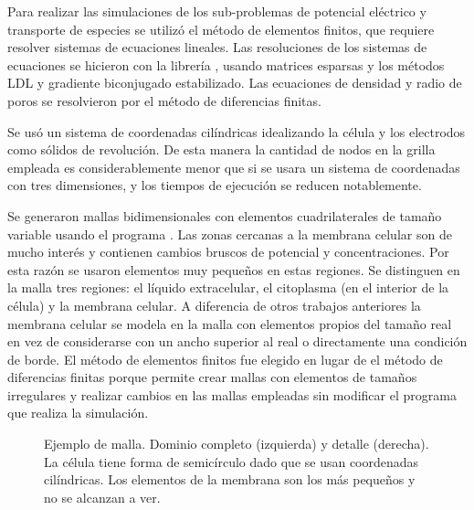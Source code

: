 Para realizar las simulaciones de los sub-problemas de potencial eléctrico y transporte de especies se utilizó el método de elementos finitos, que requiere resolver sistemas de ecuaciones lineales. Las resoluciones de los sistemas de ecuaciones se hicieron con la librería , usando matrices esparsas y los métodos LDL y gradiente biconjugado estabilizado. Las ecuaciones de densidad y radio de poros se resolvieron por el método de diferencias finitas. %

Se usó un sistema de coordenadas cilíndricas idealizando la célula y los electrodos como sólidos de revolución. De esta manera la cantidad de nodos en la grilla empleada es considerablemente menor que si se usara un sistema de coordenadas con tres dimensiones, y los tiempos de ejecución se reducen notablemente. 

Se generaron mallas bidimensionales con elementos cuadrilaterales de tamaño variable usando el programa  \cite{automesh}. Las zonas cercanas a la membrana celular son de mucho interés y contienen cambios bruscos de potencial y concentraciones. Por esta razón se usaron elementos muy pequeños en estas regiones. Se distinguen en la malla tres regiones: el líquido extracelular, el citoplasma (en el interior de la célula) y la membrana celular. A diferencia de otros trabajos anteriores la membrana celular se modela en la malla con elementos propios del tamaño real en vez de considerarse con un ancho superior al real o directamente una condición de borde. El método de elementos finitos fue elegido en lugar de el método de diferencias finitas porque permite crear mallas con elementos de tamaños irregulares y realizar cambios en las mallas empleadas sin modificar el programa que realiza la simulación.

\begin{figure} 
\caption{Ejemplo de malla. Dominio completo (izquierda) y detalle (derecha). La célula tiene forma de semicírculo dado que se usan coordenadas cilíndricas. Los elementos de la membrana son los más pequeños y no se alcanzan a ver.}
\end{figure}


